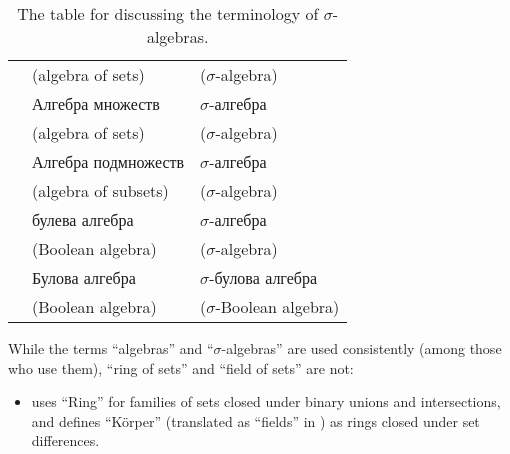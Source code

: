 \begin{remark}
\begin{table}[!ht]
\begin{tabular}{l l l}
                                                                 & \footnotesize (algebra of sets)                       & \footnotesize (\( \sigma \)-algebra)             \\
      \cite[def. 1.2.1; def. 1.2.2]{Богачёв2003ТеорияМерыТом1}   & Алгебра множеств                                      & \( \sigma \)-алгебра                             \\
                                                                 & \footnotesize (algebra of sets)                       & \footnotesize (\( \sigma \)-algebra)             \\
      \cite[def. II.1.1; def. II.1.4]{Ширяев2007ВероятностиТом1} & Алгебра подмножеств                                   & \( \sigma \)-алгебра                             \\
                                                                 & \footnotesize (algebra of subsets)                    & \footnotesize (\( \sigma \)-algebra)             \\
      \cite[def. 3.1; def. 3.3]{Драганов2022ТеорияНаМярката}     & булева алгебра                                        & \( \sigma \)-алгебра                             \\
                                                                 & \footnotesize (Boolean algebra)                       & \footnotesize (\( \sigma \)-algebra)     \\
      \cite[def. 1.1; def. 1.2]{ДимитровЯнев2007Статистика}      & Булова алгебра                                        & \( \sigma \)-булова алгебра                      \\
                                                                 & \footnotesize (Boolean algebra)                       & \footnotesize (\( \sigma \)-Boolean algebra)     \\
      \bottomrule
    \end{tabular}
    \caption{The table for  discussing the terminology of \( \sigma \)-algebras.}\label{tab:rem:sigma_algebra_terminology}
  \end{table}

  While the terms \enquote{algebras} and \enquote{\( \sigma \)-algebras} are used consistently (among those who use them), \enquote{ring of sets} and \enquote{field of sets} are not:
  \begin{itemize}
    \item {} uses \enquote{Ring} for families of sets closed under binary unions and intersections, and defines \enquote{K\"{o}rper} (translated as \enquote{fields} in \cite[90]{Hausdorff1962Sets}) as rings closed under set differences.


\end{itemize}
\end{remark}
